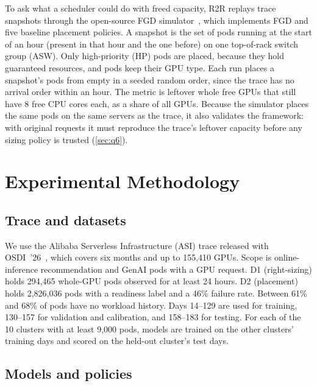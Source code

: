 \documentclass[10pt]{article}
\begin{document}
To ask what a scheduler could do with freed capacity, R2R replays trace snapshots through the open-source FGD simulator~\citep{weng2023fgd}, which implements FGD and five baseline placement policies. A snapshot is the set of pods running at the start of an hour (present in that hour and the one before) on one top-of-rack switch group (ASW). Only high-priority (HP) pods are placed, because they hold guaranteed resources, and pods keep their GPU type. Each run places a snapshot's pods from empty in a seeded random order, since the trace has no arrival order within an hour. The metric is leftover whole free GPUs that still have 8 free CPU cores each, as a share of all GPUs. Because the simulator places the same pods on the same servers as the trace, it also validates the framework: with original requests it must reproduce the trace's leftover capacity before any sizing policy is trusted (\cref{sec:q6}).

\section{Experimental Methodology}
\label{sec:method}

\subsection{Trace and datasets}
\label{sec:data}

We use the Alibaba Serverless Infrastructure (ASI) trace released with OSDI~'26~\citep{li2026asi,alibaba2026trace}, which covers six months and up to 155{,}410 GPUs. Scope is online-inference recommendation and GenAI pods with a GPU request. D1 (right-sizing) holds 294{,}465 whole-GPU pods observed for at least 24 hours. D2 (placement) holds 2{,}826{,}036 pods with a readiness label and a 46\% failure rate. Between 61\% and 68\% of pods have no workload history. Days 14--129 are used for training, 130--157 for validation and calibration, and 158--183 for testing. For each of the 10 clusters with at least 9{,}000 pods, models are trained on the other clusters' training days and scored on the held-out cluster's test days.

\subsection{Models and policies}
\label{sec:models}
\end{document}

